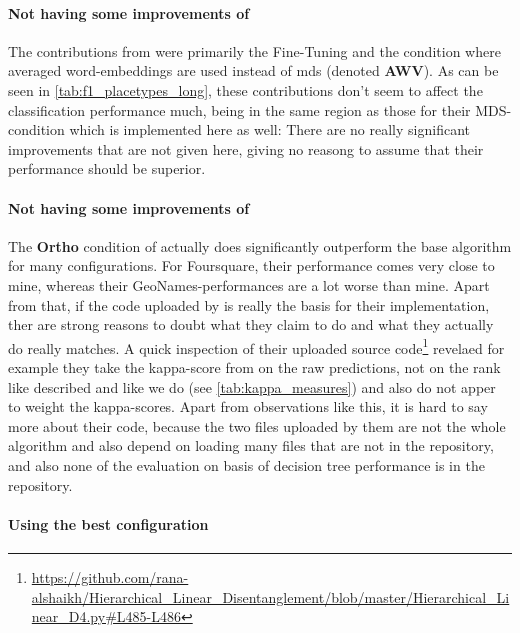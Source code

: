 \paragraph{Not having some improvements of \cite{Ager2018}}
The contributions from \cite{Ager2018} were primarily the Fine-Tuning and the condition where averaged word-embeddings are used instead of \gls{mds} (denoted \textbf{AWV}). As can be seen in \autoref{tab:f1_placetypes_long}, these contributions don't seem to affect the classification performance much, being in the same region as those for their MDS-condition which is implemented here as well: There are no really significant improvements that are not given here, giving no reasong to assume that their performance should be superior.  

\paragraph{Not having some improvements of \cite{Alshaikh2020}}

The \textbf{Ortho} condition of \cite{Alshaikh2020} actually does significantly outperform the base algorithm for many configurations. For Foursquare, their performance comes very close to mine, whereas their GeoNames-performances are a lot worse than mine. Apart from that, if the code uploaded by \cite{Alshaikh2020} is really the basis for their implementation, ther are strong reasons to doubt what they claim to do and what they actually do really matches. A quick inspection of their uploaded source code\footnote{\url{https://github.com/rana-alshaikh/Hierarchical_Linear_Disentanglement/blob/master/Hierarchical_Linear_D4.py\#L485-L486}} revelaed for example they take the kappa-score from on the raw predictions, not on the rank like \cite{Derrac2015} described and like we do (see \autoref{tab:kappa_measures}) and also do not apper to weight the kappa-scores. Apart from observations like this, it is hard to say more about their code, because the two files uploaded by them are not the whole algorithm and also depend on loading many files that are not in the repository, and also none of the evaluation on basis of decision tree performance is in the repository.

\paragraph{Using the best configuration}

